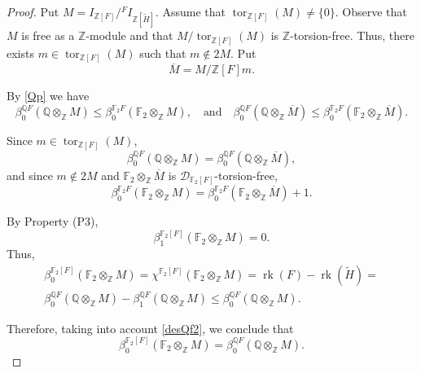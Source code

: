 \documentclass[10pt,a4paper]{amsart}
\DeclareMathOperator{\tor}{tor}
\begin{document}
\begin{proof}Put 
\(
M = I_{\mathbb{Z}[F]}/{}^{F}I_{\mathbb{Z}[\widetilde{H}]}.
\)
Assume that $\tor_{\mathbb{Z}[F]}(M) \neq \{0\}$. Observe that $M$ is free as a $\mathbb{Z}$-module and that $M / \tor_{\mathbb{Z}[F]}(M)$ is $\mathbb{Z}$-torsion-free. Thus, there exists $m \in \tor_{\mathbb{Z}[F]}(M)$ such that $m \notin 2M$.  
Put 
\[
\overline{M} = M / \mathbb{Z}[F]m.
\]

By \cref{Qp} we have
\begin{equation}\label{desQf2}
\beta_0^{\mathbb{Q}F}\!\left(\mathbb{Q} \otimes_{\mathbb{Z}} M\right) 
   \leq \beta_0^{\mathbb{F}_2 F}\!\left(\mathbb{F}_2 \otimes_{\mathbb{Z}} M\right),
   \quad\text{and}\quad
\beta_0^{\mathbb{Q}F}\!\left(\mathbb{Q} \otimes_{\mathbb{Z}} \overline{M}\right) 
   \leq \beta_0^{\mathbb{F}_2 F}\!\left(\mathbb{F}_2 \otimes_{\mathbb{Z}} \overline{M}\right).
\end{equation}

Since $m \in \tor_{\mathbb{Z}[F]}(M)$,
\begin{equation}
 \label{igQ}
\beta_0^{\mathbb{Q}F}\!\left(\mathbb{Q} \otimes_{\mathbb{Z}} M\right) 
   = \beta_0^{\mathbb{Q}F}\!\left(\mathbb{Q} \otimes_{\mathbb{Z}} \overline{M}\right),
\end{equation}
and since $m \notin 2M$ and $\mathbb{F}_2 \otimes_{\mathbb{Z}} \overline{M}$ is $\mathcal{D}_{\mathbb{F}_2[F]}$-torsion-free,
\begin{equation}
    \label{desF2}
\beta_0^{\mathbb{F}_2 F}\!\left(\mathbb{F}_2 \otimes_{\mathbb{Z}} M\right) 
   = \beta_0^{\mathbb{F}_2 F}\!\left(\mathbb{F}_2 \otimes_{\mathbb{Z}} \overline{M}\right) + 1.
\end{equation}

By Property (P3), 
\[
\beta_1^{\mathbb{F}_2[F]}\!\left(\mathbb{F}_2 \otimes_{\mathbb{Z}} M\right) = 0.
\] 
Thus, 
\begin{multline*}
\beta_0^{\mathbb{F}_2[F]}\!\left(\mathbb{F}_2 \otimes_{\mathbb{Z}} M\right) 
   = \chi^{\mathbb{F}_2[F]}\!\left(\mathbb{F}_2 \otimes_{\mathbb{Z}} M\right) =\operatorname{rk}(F) - \operatorname{rk}(\widetilde{H}) 
   = \\ \beta_0^{\mathbb{Q}F}\!\left(\mathbb{Q} \otimes_{\mathbb{Z}} M\right) 
     - \beta_1^{\mathbb{Q}F}\!\left(\mathbb{Q} \otimes_{\mathbb{Z}} M\right) 
   \leq \beta_0^{\mathbb{Q}F}\!\left(\mathbb{Q} \otimes_{\mathbb{Z}} M\right).
\end{multline*}

Therefore, taking into account \cref{desQf2}, we conclude that 
\begin{equation}
    \label{igQF2}
\beta_0^{\mathbb{F}_2[F]}\!\left(\mathbb{F}_2 \otimes_{\mathbb{Z}} M\right) 
   = \beta_0^{\mathbb{Q}F}\!\left(\mathbb{Q} \otimes_{\mathbb{Z}} M\right).
\end{equation}


\end{proof}
\end{document}

